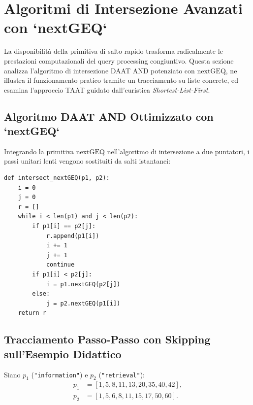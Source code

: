 \FloatBarrier
\section{Algoritmi di Intersezione Avanzati con `nextGEQ`}
\label{sec:intersezioni-ottimizzate-nextgeq}

La disponibilit\`a della primitiva di salto rapido trasforma radicalmente le prestazioni computazionali del query processing congiuntivo. Questa sezione analizza l'algoritmo di intersezione DAAT AND potenziato con $\text{nextGEQ}$, ne illustra il funzionamento pratico tramite un tracciamento su liste concrete, ed esamina l'approccio TAAT guidato dall'euristica \textit{Shortest-List-First}.

\FloatBarrier
\subsection{Algoritmo DAAT AND Ottimizzato con `nextGEQ`}
\label{subsec:daat-and-nextgeq-ottimizzato}
Integrando la primitiva $\text{nextGEQ}$ nell'algoritmo di intersezione a due puntatori, i passi unitari lenti vengono sostituiti da salti istantanei:

\begin{lstlisting}[style=pythoncode, caption={Intersezione DAAT AND ottimizzata con salti $\text{nextGEQ}$.}, label={lst:daat-and-nextgeq}]
def intersect_nextGEQ(p1, p2):
    i = 0
    j = 0
    r = []
    while i < len(p1) and j < len(p2):
        if p1[i] == p2[j]:
            r.append(p1[i])
            i += 1
            j += 1
            continue
        if p1[i] < p2[j]:
            i = p1.nextGEQ(p2[j])
        else:
            j = p2.nextGEQ(p1[i])
    return r
\end{lstlisting}

\FloatBarrier
\subsection{Tracciamento Passo-Passo con Skipping sull'Esempio Didattico}
Siano $p_1$ (\texttt{"information"}) e $p_2$ (\texttt{"retrieval"}):
\begin{align*}
p_1 &= [1, 5, 8, 11, 13, 20, 35, 40, 42], \\
p_2 &= [1, 5, 6, 8, 11, 15, 17, 50, 60].
\end{align*}

